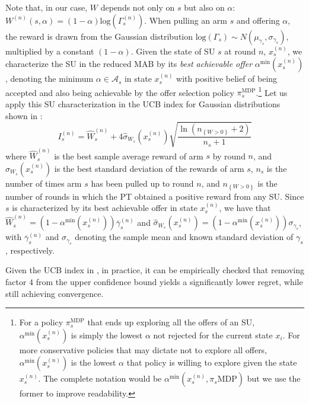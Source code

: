 Note that, in our case, $W$ depends not only on $s$ but also on $\alpha$: $W^{(n)}(s,\alpha) = (1-\alpha)\text{log}(\Gamma_s^{(n)})$. When pulling an arm $s$ and offering $\alpha$, the reward is drawn from the Gaussian distribution $\text{log}(\Gamma_s) \sim N(\mu_{\gamma_s},\sigma_{\gamma_s})$, multiplied by a constant $(1-\alpha)$. 
Given the state of SU $s$ at round $n$, $x_s^{(n)}$, we characterize the SU in the reduced MAB by its \textit{best achievable offer} $\alpha^{\text{min}}(x_s^{(n)})$, denoting the minimum $\alpha \in \mathcal{A}_s$ in state $x_s^{(n)}$ with positive belief of being accepted and also being achievable by the offer selection policy $\pi_s^{\text{MDP}}$.\footnote{For a policy $\pi_s^{\text{MDP}}$ that ends up exploring all the offers of an SU, $\alpha^{\text{min}}(x_s^{(n)})$ is simply the lowest $\alpha$ not rejected for the current state $x_i$. For more conservative policies that may dictate not to explore all offers, $\alpha^{\text{min}}(x_s^{(n)})$ is the lowest $\alpha$ that policy is willing to explore given the state $x_s^{(n)}$. The complete notation would be $\alpha^{\text{min}}(x_s^{(n)},\pi_s{\text{MDP}})$ but we use the former to improve readability.} Let us apply this SU characterization in the UCB index for Gaussian distributions shown in \cite{ref:Auer2002}:
\begin{equation}\label{index}
I_{s}^{(n)} = \hat{W}^{(n)}_s + 4 \hat\sigma_{W_{s}}(x_s^{(n)})\sqrt{\frac{\ln(n_{\left\{W>0\right\}} + 2)}{n_s+1}}
\end{equation}
where $\hat{W}^{(n)}_s$ is the best sample average reward of arm $s$ by round $n$, and $\hat\sigma_{W_{s}}(x_s^{(n)})$ is the best standard deviation of the rewards of arm $s$, $n_s$ is the number of times arm $s$ has been pulled up to round $n$, and $n_{\left\{W>0\right\}} $ is the number of rounds in which the PT obtained a positive reward from any SU. Since $s$ is characterized by its best achievable offer in state $x_s^{(n)}$, we have that $\hat{W}_s^{(n)} = (1-\alpha^{\text{min}}(x_s^{(n)}))\overline\gamma_s^{(n)}$ and $\hat\sigma_{W_s}(x_s^{(n)}) = (1-\alpha^{\text{min}}(x_s^{(n)}))\sigma_{\gamma_s}$, with $\overline\gamma_s^{(n)}$ and $\sigma_{\gamma_s}$ denoting the sample mean and known standard deviation of $\gamma_s$, respectively.

Given the UCB index in \cite{ref:Auer2002}, in practice, it can be empirically checked that removing factor $4$ from the upper confidence bound yields a significantly lower regret, while still achieving convergence. 


